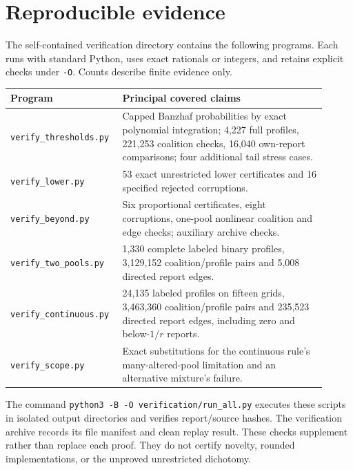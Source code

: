 \documentclass[11pt]{article}
\theoremstyle{definition}\newtheorem{definition}[theorem]{Definition}
\theoremstyle{remark}\newtheorem{remark}[theorem]{Remark}
\begin{document}
\section{Reproducible evidence}\label{app:verification}
The self-contained verification directory contains the following programs.
Each runs with standard Python, uses exact rationals or integers, and retains
explicit checks under \texttt{-O}. Counts describe finite evidence only.
\begin{center}
\small
\begin{tabular}{p{0.29\linewidth}p{0.62\linewidth}}
\toprule
Program & Principal covered claims\\
\midrule
\texttt{verify\_thresholds.py} & Capped Banzhaf probabilities by exact polynomial
integration; 4,227 full profiles, 221,253 coalition checks, 16,040 own-report
comparisons; four additional tail stress cases.\\[3pt]
\texttt{verify\_lower.py} & 53 exact unrestricted lower certificates and 16
specified rejected corruptions.\\[3pt]
\texttt{verify\_beyond.py} & Six proportional certificates, eight corruptions,
one-pool nonlinear coalition and edge checks; auxiliary archive checks.\\[3pt]
\texttt{verify\_two\_pools.py} & 1,330 complete labeled binary profiles,
3,129,152 coalition/profile pairs and 5,008 directed report edges.\\[3pt]
\texttt{verify\_continuous.py} & 24,135 labeled profiles on fifteen grids,
3,463,360 coalition/profile pairs and 235,523 directed report edges, including
zero and below-$1/r$ reports.\\[3pt]
\texttt{verify\_scope.py} & Exact substitutions for the continuous rule's
many-altered-pool limitation and an alternative mixture's failure.\\
\bottomrule
\end{tabular}
\end{center}
The command \texttt{python3 -B -O verification/run\_all.py} executes these
scripts in isolated output directories and verifies report/source hashes.
The verification archive records its file manifest and clean replay result.
These checks supplement rather than replace each proof. They do not certify
novelty, rounded implementations, or the unproved unrestricted dichotomy.
\end{document}
